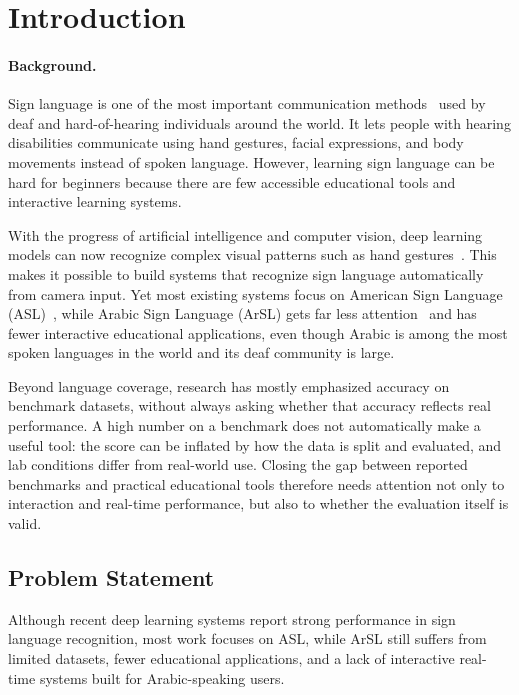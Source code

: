 \section{Introduction}

\paragraph{Background.}
Sign language is one of the most important communication methods~\cite{who2021}
used by deaf and hard-of-hearing individuals around the world. It lets people with
hearing disabilities communicate using hand gestures, facial expressions, and body
movements instead of spoken language. However, learning sign language can be hard
for beginners because there are few accessible educational tools and interactive
learning systems.

With the progress of artificial intelligence and computer vision, deep learning
models can now recognize complex visual patterns such as hand
gestures~\cite{krizhevsky2012}. This makes it possible to build systems that
recognize sign language automatically from camera input. Yet most existing systems
focus on American Sign Language (ASL)~\cite{rastgoo2021survey}, while Arabic Sign
Language (ArSL) gets far less attention~\cite{mohandes2014} and has fewer
interactive educational applications, even though Arabic is among the most spoken
languages in the world and its deaf community is large.

Beyond language coverage, research has mostly emphasized accuracy on benchmark
datasets, without always asking whether that accuracy reflects real performance. A
high number on a benchmark does not automatically make a useful tool: the score can
be inflated by how the data is split and evaluated, and lab conditions differ from
real-world use. Closing the gap between reported benchmarks and practical
educational tools therefore needs attention not only to interaction and real-time
performance, but also to whether the evaluation itself is valid.

\subsection{Problem Statement}
Although recent deep learning systems report strong performance in sign language
recognition, most work focuses on ASL, while ArSL still suffers from limited
datasets, fewer educational applications, and a lack of interactive real-time
systems built for Arabic-speaking users.

